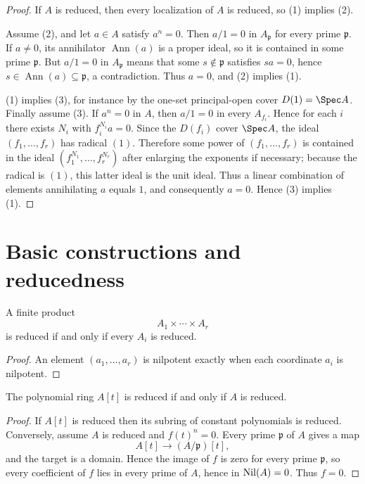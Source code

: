\begin{proof}
If $A$ is reduced, then every localization of $A$ is reduced, so (1) implies (2).

Assume (2), and let $a\in A$ satisfy $a^n=0$.  Then $a/1=0$ in $A_{\mathfrak p}$ for
every prime $\mathfrak p$.  If $a\ne0$, its annihilator $\operatorname{Ann}(a)$ is a
proper ideal, so it is contained in some prime $\mathfrak p$.  But $a/1=0$ in
$A_{\mathfrak p}$ means that some $s\notin\mathfrak p$ satisfies $sa=0$, hence
$s\in\operatorname{Ann}(a)\subseteq\mathfrak p$, a contradiction.  Thus $a=0$, and
(2) implies (1).

(1) implies (3), for instance by the one-set principal-open cover
$D(1)=\Spec A$.  Finally assume (3).  If $a^n=0$ in $A$, then $a/1=0$ in every
$A_{f_i}$.  Hence for each $i$ there exists $N_i$ with $f_i^{N_i}a=0$.  Since the
$D(f_i)$ cover $\Spec A$, the ideal $(f_1,\dots,f_r)$ has radical $(1)$.  Therefore
some power of $(f_1,\dots,f_r)$ is contained in the ideal
$(f_1^{N_1},\dots,f_r^{N_r})$ after enlarging the exponents if necessary; because the
radical is $(1)$, this latter ideal is the unit ideal.  Thus a linear combination of
elements annihilating $a$ equals $1$, and consequently $a=0$.  Hence (3) implies (1).
\end{proof}



\section{Basic constructions and reducedness}

\begin{proposition}[Products]
A finite product
\[
A_1\times\cdots\times A_r
\]
is reduced if and only if every $A_i$ is reduced.
\end{proposition}

\begin{proof}
An element $(a_1,\dots,a_r)$ is nilpotent exactly when each coordinate $a_i$ is nilpotent.
\end{proof}

\begin{proposition}
The polynomial ring $A[t]$ is reduced if and only if $A$ is reduced.
\end{proposition}

\begin{proof}
If $A[t]$ is reduced then its subring of constant polynomials is reduced.  Conversely,
assume $A$ is reduced and $f(t)^n=0$.  Every prime $\mathfrak p$ of $A$ gives a map
\[
A[t]\to (A/\mathfrak p)[t],
\]
and the target is a domain.  Hence the image of $f$ is zero for every prime
$\mathfrak p$, so every coefficient of $f$ lies in every prime of $A$, hence in
$\operatorname{Nil}(A)=0$.  Thus $f=0$.
\end{proof}


